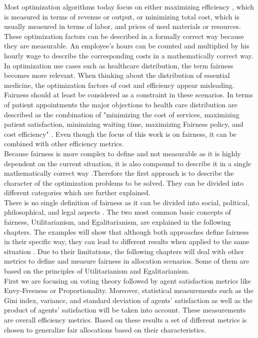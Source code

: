 \documentclass[german, a4paper, 11pt, oneside]{scrbook}
\begin{document}
Most optimization algorithms today focus on either maximizing efficiency \cite{Foulds.7222018}, which is measured in terms of revenue or output, or minimizing total cost, which is usually measured in terms of labor, and prices of used materials or resources. \cite{XinyingChen.2023, Hooker} These optimization factors can be described in a formally correct way because they are measurable. An employee's hours can be counted and multiplied by his hourly wage to describe the corresponding costs in a mathematically correct way. \\In optimization use cases such as healthcare distribution, the term fairness becomes more relevant. When thinking about the distribution of essential medicine, the optimization factors of cost and efficiency appear misleading. Fairness should at least be considered as a constraint in these scenarios. In terms of patient appointments the major objections to health care distribution are described as the combination of "minimizing the cost of services, maximizing patient satisfaction, minimizing waiting time, maximizing Fairness policy, and cost efficiency" \cite{Ala.2021}. Even though the focus of this work is on fairness, it can be combined with other efficiency metrics.\\ Because fairness is more complex to define and not measurable as it is highly dependent on the current situation, it is also compound to describe it in a single mathematically correct way \cite{Binns.}.Therefore the first approach is to describe the character of the optimization problems to be solved. They can be divided into different categories which are further explained. \\ There is no single definition of fairness as it can be divided into social, political, philosophical, and legal aspects \cite{Foulds.7222018}. The two most common basic concepts of fairness, Utilitarianism, and Egalitarianism, are explained in the following chapters. The examples will show that although both approaches define fairness in their specific way, they can lead to different results when applied to the same situation \cite{Yu.7222022}. Due to their limitations, the following chapters will deal with other metrics to define and measure fairness in allocation scenarios. Some of them are based on the principles of Utilitarianism and Egalitarianism. \\ First we are focusing on voting theory followed by agent satisfaction metrics like Envy-Freeness or Proportionality. Moreover, statistical measurements such as the Gini index, variance, and standard deviation of agents' satisfaction as well as the product of agents' satisfaction will be taken into account. These measurements are overall efficiency metrics. Based on these results a set of different metrics is chosen to generalize fair allocations based on their characteristics.
\end{document}

